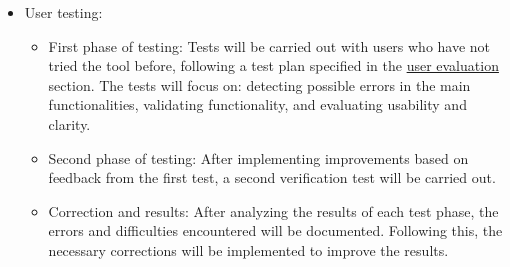 \begin{itemize}
\begin{itemize}
	\end{itemize}
    \item User testing:
	\begin{itemize}
	    \item First phase of testing: Tests will be carried out with users who have not tried the tool before, following a test plan specified in the \hyperref[cap:evaluacionConUsuarios]{user evaluation} section. The tests will focus on: detecting possible errors in the main functionalities, validating functionality, and evaluating usability and clarity.
	    \item Second phase of testing: After implementing improvements based on feedback from the first test, a second verification test will be carried out.
	    \item Correction and results: After analyzing the results of each test phase, the errors and difficulties encountered will be documented. Following this, the necessary corrections will be implemented to improve the results.
	\end{itemize}

\end{itemize}
